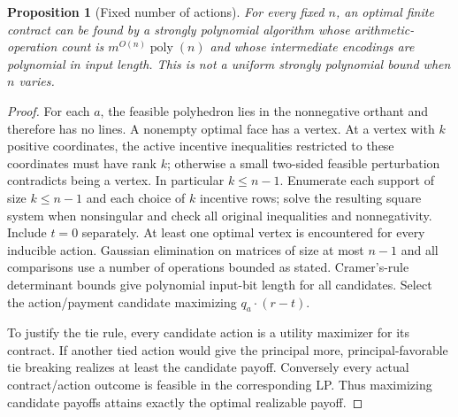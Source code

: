 \documentclass[11pt]{article}
\newtheorem{proposition}[theorem]{Proposition}
\theoremstyle{definition}
\begin{document}
\begin{proposition}[Fixed number of actions]
For every fixed $n$, an optimal finite contract can be found by a strongly
polynomial algorithm whose arithmetic-operation count is
$m^{O(n)}\operatorname{poly}(n)$ and whose intermediate encodings are polynomial
in input length. This is not a uniform strongly polynomial bound when $n$ varies.
\end{proposition}
\begin{proof}
For each $a$, the feasible polyhedron lies in the nonnegative orthant and
therefore has no lines. A nonempty optimal face has a vertex. At a vertex
with $k$ positive coordinates, the active incentive inequalities restricted
to these coordinates must have rank $k$; otherwise a small two-sided feasible
perturbation contradicts being a vertex. In particular $k\leq n-1$.
Enumerate each support of size $k\leq n-1$ and each choice of $k$ incentive
rows; solve the resulting square system when nonsingular and check all original
inequalities and nonnegativity. Include $t=0$ separately. At least one optimal
vertex is encountered for every inducible action. Gaussian elimination on
matrices of size at most $n-1$ and all comparisons use a number of operations
bounded as stated. Cramer's-rule determinant bounds give polynomial input-bit
length for all candidates. Select the action/payment candidate maximizing
$q_a\cdot(r-t)$.

To justify the tie rule, every candidate action is a utility maximizer for its
contract. If another tied action would give the principal more, principal-favorable
tie breaking realizes at least the candidate payoff. Conversely every actual
contract/action outcome is feasible in the corresponding LP. Thus maximizing
candidate payoffs attains exactly the optimal realizable payoff.
\end{proof}
\end{document}
